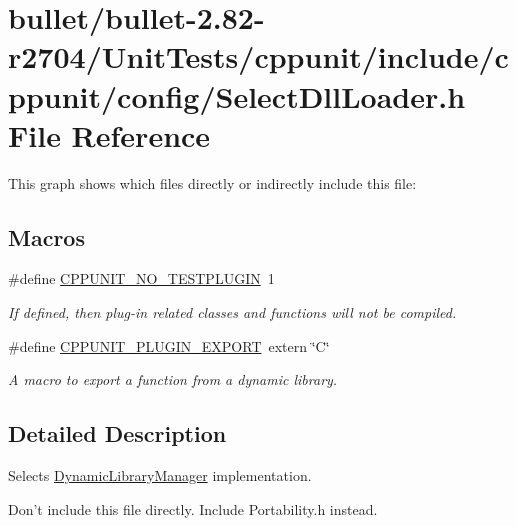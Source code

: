 \hypertarget{bullet_2bullet-2_882-r2704_2_unit_tests_2cppunit_2include_2cppunit_2config_2_select_dll_loader_8h}{\section{bullet/bullet-\/2.82-\/r2704/\+Unit\+Tests/cppunit/include/cppunit/config/\+Select\+Dll\+Loader.h File Reference}
\label{bullet_2bullet-2_882-r2704_2_unit_tests_2cppunit_2include_2cppunit_2config_2_select_dll_loader_8h}
}
This graph shows which files directly or indirectly include this file\+:
\subsection*{Macros}
\begin{DoxyCompactItemize}
\item 
\hypertarget{bullet_2bullet-2_882-r2704_2_unit_tests_2cppunit_2include_2cppunit_2config_2_select_dll_loader_8h_a55b6e7232bf4c15eca3cd64753c17272}{\#define \hyperlink{bullet_2bullet-2_882-r2704_2_unit_tests_2cppunit_2include_2cppunit_2config_2_select_dll_loader_8h_a55b6e7232bf4c15eca3cd64753c17272}{C\+P\+P\+U\+N\+I\+T\+\_\+\+N\+O\+\_\+\+T\+E\+S\+T\+P\+L\+U\+G\+I\+N}~1}\label{bullet_2bullet-2_882-r2704_2_unit_tests_2cppunit_2include_2cppunit_2config_2_select_dll_loader_8h_a55b6e7232bf4c15eca3cd64753c17272}

\begin{DoxyCompactList}\small\item\em If defined, then plug-\/in related classes and functions will not be compiled. \end{DoxyCompactList}\item 
\#define \hyperlink{group___writing_test_plug_in_ga477408f06c41af1d46b8f17f21b3b5d6}{C\+P\+P\+U\+N\+I\+T\+\_\+\+P\+L\+U\+G\+I\+N\+\_\+\+E\+X\+P\+O\+R\+T}~extern \char`\"{}C\char`\"{}
\begin{DoxyCompactList}\small\item\em A macro to export a function from a dynamic library. \end{DoxyCompactList}\end{DoxyCompactItemize}


\subsection{Detailed Description}
Selects \hyperlink{class_dynamic_library_manager}{Dynamic\+Library\+Manager} implementation.

Don't include this file directly. Include Portability.\+h instead. 